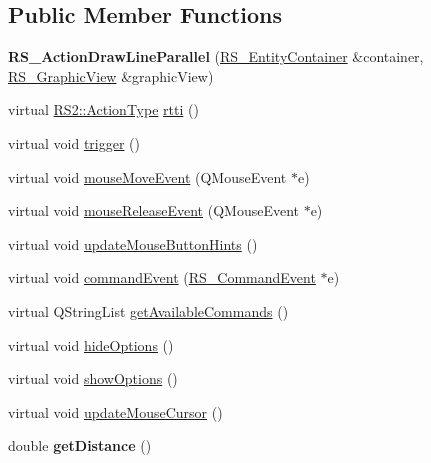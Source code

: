 \subsection*{Public Member Functions}
\begin{DoxyCompactItemize}
\item 
\hypertarget{classRS__ActionDrawLineParallel_a2f132fb4568bd20c3cea52865c9082b7}{{\bfseries R\-S\-\_\-\-Action\-Draw\-Line\-Parallel} (\hyperlink{classRS__EntityContainer}{R\-S\-\_\-\-Entity\-Container} \&container, \hyperlink{classRS__GraphicView}{R\-S\-\_\-\-Graphic\-View} \&graphic\-View)}\label{classRS__ActionDrawLineParallel_a2f132fb4568bd20c3cea52865c9082b7}

\item 
virtual \hyperlink{classRS2_afe3523e0bc41fd637b892321cfc4b9d7}{R\-S2\-::\-Action\-Type} \hyperlink{classRS__ActionDrawLineParallel_a9e9e36ac29b76f01b29e113ab303a3d8}{rtti} ()
\item 
virtual void \hyperlink{classRS__ActionDrawLineParallel_a4c5b1741cad88c4bb0a2b3d3c7bb9445}{trigger} ()
\item 
virtual void \hyperlink{classRS__ActionDrawLineParallel_ac9681aed378737e2445700bcdd7c3180}{mouse\-Move\-Event} (Q\-Mouse\-Event $\ast$e)
\item 
virtual void \hyperlink{classRS__ActionDrawLineParallel_a664e9970103d901e92d40f9138b46a29}{mouse\-Release\-Event} (Q\-Mouse\-Event $\ast$e)
\item 
virtual void \hyperlink{classRS__ActionDrawLineParallel_aa06f7e91c8dcddf32c41a793a4413782}{update\-Mouse\-Button\-Hints} ()
\item 
virtual void \hyperlink{classRS__ActionDrawLineParallel_acc6c4a6bb166c30b9b04073909eb976c}{command\-Event} (\hyperlink{classRS__CommandEvent}{R\-S\-\_\-\-Command\-Event} $\ast$e)
\item 
virtual Q\-String\-List \hyperlink{classRS__ActionDrawLineParallel_a08ec81fc8689db71c50db08e0144fed9}{get\-Available\-Commands} ()
\item 
virtual void \hyperlink{classRS__ActionDrawLineParallel_aad898d9734120d3fe57740b4956eff66}{hide\-Options} ()
\item 
virtual void \hyperlink{classRS__ActionDrawLineParallel_ab8003b3639948033eb5ee04077478a94}{show\-Options} ()
\item 
virtual void \hyperlink{classRS__ActionDrawLineParallel_a0bc86e6cc3294658ff120cce31063ac1}{update\-Mouse\-Cursor} ()
\item 
\hypertarget{classRS__ActionDrawLineParallel_aac08f125314313fb132c30b3172cb9ed}{double {\bfseries get\-Distance} ()}\label{classRS__ActionDrawLineParallel_aac08f125314313fb132c30b3172cb9ed}


\end{DoxyCompactItemize}
